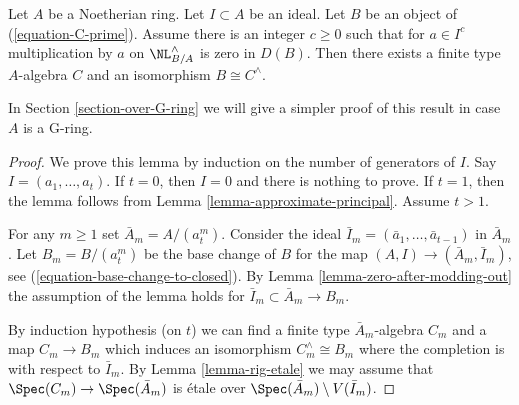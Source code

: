 \begin{lemma}
\label{lemma-approximate}
Let $A$ be a Noetherian ring. Let $I \subset A$ be an ideal.
Let $B$ be an object of (\ref{equation-C-prime}).
Assume there is an integer $c \geq 0$ such that for $a \in I^c$
multiplication by $a$ on $\NL^\wedge_{B/A}$ is zero in $D(B)$.
Then there exists a finite type $A$-algebra $C$ and an
isomorphism $B \cong C^\wedge$.
\end{lemma}

\noindent
In Section \ref{section-over-G-ring} we will give a simpler
proof of this result in case $A$ is a G-ring.

\begin{proof}
We prove this lemma by induction on the number of generators of $I$.
Say $I = (a_1, \ldots, a_t)$. If $t = 0$, then $I = 0$ and there
is nothing to prove. If $t = 1$, then the lemma follows from
Lemma \ref{lemma-approximate-principal}. Assume $t > 1$.

\medskip\noindent
For any $m \geq 1$ set $\bar A_m = A/(a_t^m)$. Consider the ideal
$\bar I_m = (\bar a_1, \ldots, \bar a_{t - 1})$ in $\bar A_m$.
Let $B_m = B/(a_t^m)$ be the base change of $B$ for the
map $(A, I) \to (\bar A_m, \bar I_m)$, see
(\ref{equation-base-change-to-closed}).
By Lemma \ref{lemma-zero-after-modding-out}
the assumption of the lemma holds for
$\bar I_m \subset \bar A_m \to B_m$.

\medskip\noindent
By induction hypothesis (on $t$) we can find a finite type
$\bar A_m$-algebra $C_m$ and a map $C_m \to B_m$ which induces an
isomorphism $C_m^\wedge \cong B_m$
where the completion is with respect to $\bar I_m$.
By Lemma \ref{lemma-rig-etale} we may assume that
$\Spec(C_m) \to \Spec(\bar A_m)$ is \'etale
over $\Spec(\bar A_m) \setminus V(\bar I_m)$.


\end{proof}
